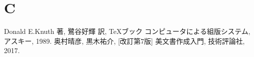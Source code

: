 \documentclass[titlepage, a4paper, 11pt, dvipdfmx]{jsarticle}
\begin{document}
\section{C}
\TQBF \TQBF \TQBF \TQBF \TQBF \TQBF \TQBF \TQBF
\TQBF \TQBF \TQBF \TQBF \TQBF \TQBF \TQBF \TQBF
\TQBF \TQBF \TQBF \TQBF \TQBF \TQBF \TQBF \TQBF
\TQBF \TQBF \TQBF \TQBF \TQBF \TQBF \TQBF \TQBF
\TQBF \TQBF \TQBF \TQBF \TQBF \TQBF \TQBF \TQBF
\TQBF \TQBF \TQBF \TQBF \TQBF \TQBF \TQBF \TQBF
\TQBF \TQBF \TQBF \TQBF \TQBF \TQBF \TQBF \TQBF
\TQBF \TQBF \TQBF \TQBF \TQBF \TQBF \TQBF \TQBF
\TQBF \TQBF \TQBF \TQBF \TQBF \TQBF \TQBF \TQBF
\TQBF \TQBF \TQBF \TQBF \TQBF \TQBF \TQBF \TQBF
\TQBF \TQBF \TQBF \TQBF \TQBF \TQBF \TQBF \TQBF
\TQBF \TQBF \TQBF \TQBF \TQBF \TQBF \TQBF \TQBF
\TQBF \TQBF \TQBF \TQBF \TQBF \TQBF \TQBF \TQBF
\TQBF \TQBF \TQBF \TQBF \TQBF \TQBF \TQBF \TQBF
\begin{thebibliography}{1}
     Donald E.Knuth 著, 鷺谷好輝 訳, \TeX ブック コンピュータによる組版システム, アスキー, 1989.
     奥村晴彦, 黒木祐介, [改訂第7版] \LaTeXe 美文書作成入門, 技術評論社, 2017.
\end{thebibliography}
\end{document}
